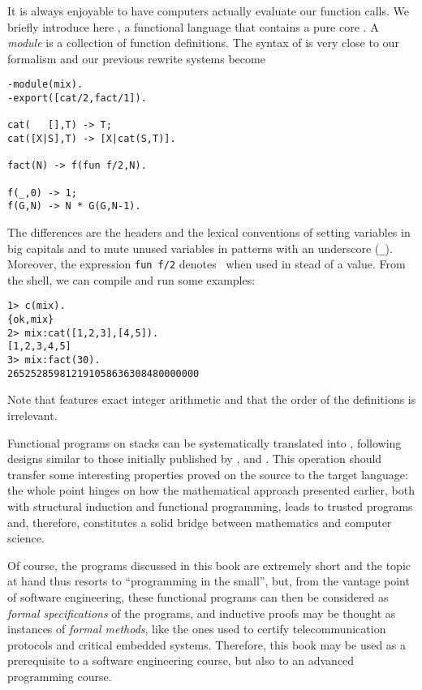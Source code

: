 
It is always enjoyable to have computers actually evaluate our
function calls. We briefly introduce here \Erlang, a functional
language that contains a pure core \citep{Armstrong_2007}. A
\emph{module} is a collection of function definitions. The syntax of
\Erlang is very close to our formalism and our previous rewrite
systems become
\begin{verbatim}
-module(mix).
-export([cat/2,fact/1]).

cat(   [],T) -> T;
cat([X|S],T) -> [X|cat(S,T)].

fact(N) -> f(fun f/2,N).

f(_,0) -> 1;
f(G,N) -> N * G(G,N-1).
\end{verbatim}
The differences are the headers and the lexical conventions of setting
variables in big capitals and to mute unused variables in patterns
with an underscore (\verb|_|). Moreover, the expression \verb|fun f/2|
denotes~ when used in stead of a value. From the \Erlang
shell, we can compile and run some examples:
\begin{verbatim}
1> c(mix).
{ok,mix}
2> mix:cat([1,2,3],[4,5]).
[1,2,3,4,5]
3> mix:fact(30).
265252859812191058636308480000000
\end{verbatim}
Note that \Erlang features exact integer arithmetic and that the order
of the definitions is irrelevant.

\label{par:java}

Functional programs on stacks can be systematically translated into
\Java, following designs similar to those initially published
by \cite{FelleisenFriedman_1997}, \cite{Bloch_2003}
and \cite{Sher_2004}. This operation should transfer some interesting
properties proved on the source to the target language: the whole
point hinges on how the mathematical approach presented earlier, both
with structural induction and functional programming, leads to trusted
\Java programs and, therefore, constitutes a solid bridge between
mathematics and computer science.

Of course, the programs discussed in this book are extremely short and
the topic at hand thus resorts to ``programming in the small'', but,
from the vantage point of software engineering, these functional
programs can then be considered as \emph{formal specifications} of the
\Java programs, and inductive proofs may be thought as instances of
\emph{formal methods}, like the ones used to certify telecommunication
protocols and critical embedded systems. Therefore, this book may be
used as a prerequisite to a software engineering course, but also to
an advanced programming course.

